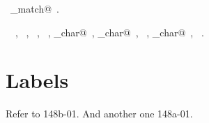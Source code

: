 \documentclass[a4paper]{report}
\begin{document}
\begin{flushleft}
\begin{minipage}{\linewidth}
\begin{list}{}{\setlength{\itemsep}{-\parsep}\setlength{\itemindent}{-\leftmargin}}
\item \NWtxtIdentsDefed\nobreak\  \verb@reject_match@\nobreak\ .\item \NWtxtIdentsUsed\nobreak\  \verb@ArgManager@\nobreak\ , \verb@FALSE@\nobreak\ , \verb@first@\nobreak\ , \verb@Name@\nobreak\ , \verb@op_char@\nobreak\ , \verb@prev_char@\nobreak\ , \verb@strlen@\nobreak\ , \verb@sym_char@\nobreak\ , \verb@TRUE@\nobreak\ .
\item{}
\end{list}
\end{minipage}\vspace{4ex}
\end{flushleft}
\section{Labels}

Refer to 148b-01.
And another one 148a-01.
\end{document}
